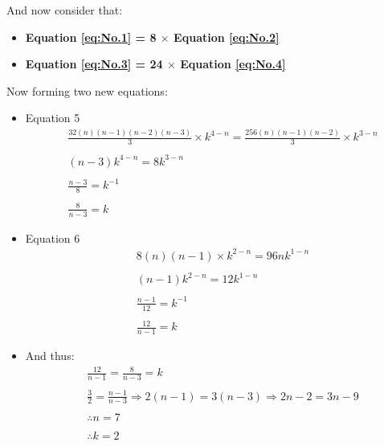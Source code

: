 \documentclass[12pt]{article}
\begin{document}
\newpage
And now consider that:
\begin{itemize}
	\item \textbf{Equation \ref{eq:No.1} = 8 $\times$ Equation \ref{eq:No.2}}
	\item \textbf{Equation \ref{eq:No.3} = 24 $\times$ Equation \ref{eq:No.4}}
\end{itemize}
Now forming two new equations:
\begin{itemize}
	\item Equation 5
	      \begin{equation}
		      \begin{split}
			       & \frac{32(n)(n-1)(n-2)(n-3)}{3} \times k^{4-n} = \frac{256(n)(n-1)(n-2)}{3} \times k^{3-n} \\ \\
			       & (n-3)k^{4-n} = 8k^{3-n}                                                                   \\ \\
			       & \frac{n-3}{8} = k^{-1}                                                                    \\ \\
			       & \frac{8}{n-3} = k
		      \end{split}
	      \end{equation}

	\item Equation 6
	      \begin{equation}
		      \begin{split}
			       & 8(n)(n-1) \times k^{2-n} =  96nk^{1-n} \\ \\
			       & (n-1)k^{2-n} = 12k^{1-n}               \\ \\
			       & \frac{n-1}{12} = k^{-1}                \\ \\
			       & \frac{12}{n-1} = k
		      \end{split}
	      \end{equation}

	\item And thus:
	      \begin{align*}
            & \frac{12}{n-1} = \frac{8}{n-3} = k \\ \\
            & \frac{3}{2} = \frac{n-1}{n-3} \Rightarrow 2(n-1) = 3(n-3) \Rightarrow 2n - 2 = 3n - 9 \\ \\ 
            & \therefore n = 7 \\ \\
            & \therefore k = 2
	      \end{align*}
\end{itemize}
\end{document}
